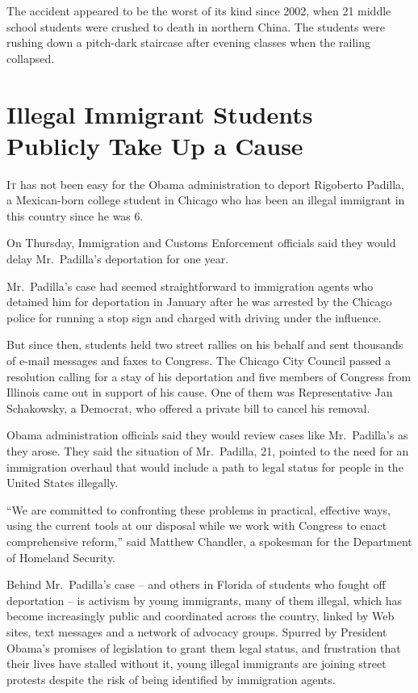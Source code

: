 ﻿\documentclass[12pt]{article}
\begin{document}
The accident appeared to be the worst of its kind since 2002, when 21 middle school students were
crushed to death in northern China. The students were rushing down a pitch-dark staircase after
evening classes when the railing collapsed.

\section{Illegal Immigrant Students Publicly Take Up a Cause}

\lettrine{I}{t} has not been easy for the Obama administration to deport
Rigoberto Padilla, a Mexican-born college student in Chicago who has been an illegal immigrant in
this country since he was 6.

On Thursday, Immigration and Customs Enforcement officials said they would delay Mr.~Padilla's
deportation for one year.

Mr.~Padilla's case had seemed straightforward to immigration agents who detained him for deportation
in January after he was arrested by the Chicago police for running a stop sign and charged with
driving under the influence.

But since then, students held two street rallies on his behalf and sent thousands of e-mail messages
and faxes to Congress. The Chicago City Council passed a resolution calling for a stay of his
deportation and five members of Congress from Illinois came out in support of his cause. One of them
was Representative Jan Schakowsky, a Democrat, who offered a private bill to cancel his removal.

Obama administration officials said they would review cases like Mr.~Padilla's as they arose. They
said the situation of Mr.~Padilla, 21, pointed to the need for an immigration overhaul that would
include a path to legal status for people in the United States illegally.

``We are committed to confronting these problems in practical, effective ways, using the current
tools at our disposal while we work with Congress to enact comprehensive reform,'' said Matthew
Chandler, a spokesman for the Department of Homeland Security.

Behind Mr.~Padilla's case -- and others in Florida of students who fought off deportation -- is
activism by young immigrants, many of them illegal, which has become increasingly public and
coordinated across the country, linked by Web sites, text messages and a network of advocacy groups.
Spurred by President Obama's promises of legislation to grant them legal status, and frustration
that their lives have stalled without it, young illegal immigrants are joining street protests
despite the risk of being identified by immigration agents.
\end{document}

